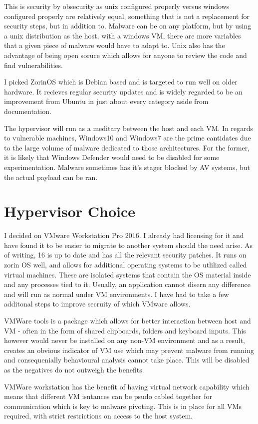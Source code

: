 This is security by obsecurity as unix configured properly versus windows configured properly are relatively equal, something that is not a replacement for security steps, but in addition to. Malware can be on any platform, but by using a unix distribution as the host, with a windows VM, there are more variables that a given piece of malware would have to adapt to. Unix also has the advantage of being open soruce which allows for anyone to review the code and find vulnerabilities.

I picked ZorinOS which is Debian based and is targeted to run well on older hardware. It recieves regular security updates and is widely regarded to be an improvement from Ubuntu in just about every category aside from documentation.

The hypervisor will run as a meditary between the host and each VM. In regards to vulnerable machines, Windows10 and Windows7 are the prime cantidates due to the large volume of malware dedicated to those architectures. For the former, it is likely that Windows Defender would need to be disabled for some experimentation. Malware sometimes has it's stager blocked by AV systems, but the actual payload can be ran.

\section{Hypervisor Choice}
I decided on VMware Workstation Pro 2016. I already had licensing for it and have found it to be easier to migrate to another system should the need arise. As of writing, 16 is up to date and has all the relevant security patches. It runs on zorin OS well, and allows for additional operating systems to be utlilized called virtual machines.
These are isolated systems that contain the OS material inside and any processes tied to it. Usually, an application cannot disern any difference and will run as normal under VM environments. I have had to take a few additonal steps to improve secruity of which VMware allows.

VMWare tools is a package which allows for better interaction between host and VM - often in the form of shared clipboards, folders and keyboard inputs. This however would never be installed on any non-VM environment and as a result, creates an obvious indicator of VM use which may prevent malware from running and consequenially behavioural analysis cannot take place. This will be disabled as the negatives do not outweigh the benefits.

VMWare workstation has the benefit of having virtual network capability which means that different VM isntances can be psudo cabled together for communication which is key to malware pivoting. This is in place for all VMs required, with strict restrictions on access to the host system.

